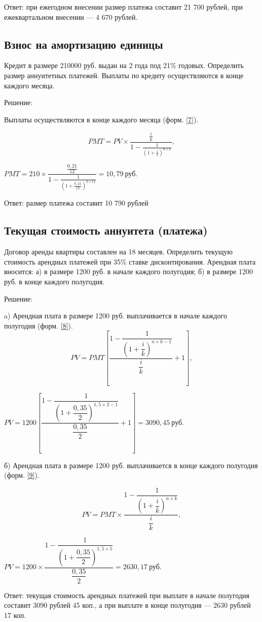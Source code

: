 Ответ: при ежегодном внесении размер платежа составит 21 700 рублей, при ежеквартальном внесении --- 4 670 рублей.

\subsection{Взнос на амортизацию единицы}

Кредит в размере 210000 руб. выдан на 2 года под 21\% годовых. 
Определить размер аннуитетных платежей. Выплаты по кредиту осуществляются в конце каждого месяца.

Решение:

Выплаты осуществляются в конце каждого месяца (форм. \ref{7}).

\begin{equation}\label{7}
PMT =PV \times\dfrac{\frac{i}{k}}{1-\frac{1}{(1+\frac{i}{k})^{n \times k}}},
\end{equation}

$ PMT =210 \times\dfrac{\frac{0,21}{12}}{1-\frac{1}{(1+\frac{0,21}{12})^{2 \times 12}}} = 10,79\  \text{руб.} $

Ответ: размер платежа составит 10 790 рублей

\subsection{Текущая стоимость аннуитета (платежа)}

Договор аренды квартиры составлен на 18 месяцев. Определить текущую стоимость арендных платежей при 35\% ставке дисконтирования. Арендная плата вносится: а) в размере 1200 руб. в начале каждого полугодия; б) в размере 1200 руб. в конце каждого полугодия.

Решение:

a) Арендная плата в размере 1200 руб. выплачивается в начале каждого полугодия (форм. \ref{8}).
\begin{equation}\label{8}
PV = PMT \left[\dfrac{1-\dfrac{1}{\left(1+\dfrac{i}{k}\right)^{n \times k -1}}}{\dfrac{i}{k}}+1\right],
\end{equation}

$PV = 1200 \left[\dfrac{1-\dfrac{1}{\left(1+\dfrac{0,35}{2}\right)^{1,5 \times 2 -1}}}{\dfrac{0,35}{2}}+1\right] = 3090,45\  \text{руб.} $

б) Арендная плата в размере 1200 руб. выплачивается в конце каждого полугодия (форм. \ref{9}).

\begin{equation}\label{9}
PV = PMT \times \dfrac{1-\dfrac{1}{\left(1+\dfrac{i}{k}\right)^{n \times k}}}{\dfrac{i}{k}},
\end{equation}

$ PV = 1200 \times \dfrac{1-\dfrac{1}{\left(1+\dfrac{0,35}{2}\right)^{1,5 \times 5}}}{\dfrac{0,35}{2}} = 2630,17\  \text{руб.} $

Ответ: текущая стоимость арендных платежей при выплате в начале полугодия составит 3090 рублей 45 коп., а при выплате в конце полугодия --- 2630 рублей 17 коп.

